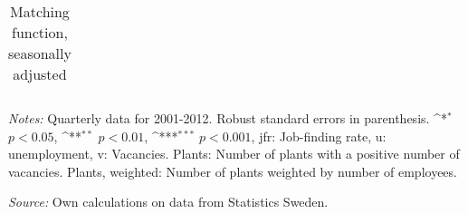 \begin{table}[htbp]\centering
\def\sym#1{\ifmmode^{#1}\else\(^{#1}\)\fi}
\caption{Matching function, seasonally adjusted \label{tab:matchning_sa}}
\begin{tabular*}{1\hsize}{@{\hskip\tabcolsep\extracolsep\fill}l*{3}{c}}
\toprule


\bottomrule

\end{tabular*}
   \begin{tablenotes}[flushleft]
      \small
\item \emph{Notes:} Quarterly data for 2001-2012. Robust standard errors in parenthesis. \sym{*} \(p<0.05\), \sym{**} \(p<0.01\), \sym{***} \(p<0.001\), jfr: Job-finding rate, u: unemployment, v: Vacancies. Plants: Number of plants with a positive number of vacancies. Plants, weighted: Number of plants weighted by number of employees. \\
\item  \emph{Source:} Own calculations on data from Statistics Sweden.
    \end{tablenotes}
\end{table}

